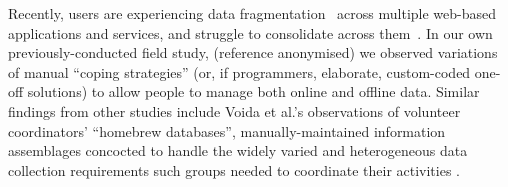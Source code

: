 \documentclass{sigchi}
\begin{document}
Recently, users are experiencing data fragmentation~\cite{Jones05towardsa} across multiple web-based applications and services, and struggle to consolidate across them~\cite{bergman,boardmansasse}.  In our own previously-conducted field study, (reference anonymised) we observed variations of manual ``coping strategies'' (or, if programmers, elaborate, custom-coded one-off solutions) to allow people to manage both online and offline data.  Similar findings from other studies include Voida et al.'s observations of volunteer coordinators' ``homebrew databases'', manually-maintained information assemblages concocted to handle the widely varied and heterogeneous data collection requirements such groups needed to coordinate their activities \cite{Voida:2011:HDC:1978942.1979078}.












\end{document}

